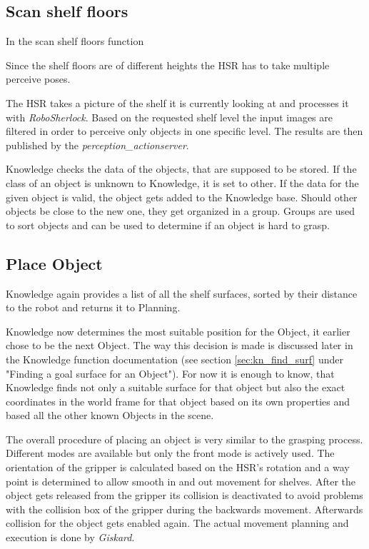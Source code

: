 \documentclass[main.tex]{subfiles}
\begin{document}
	\subsection{Scan shelf floors}
	
	In the scan shelf floors function
	
	Since the shelf floors are of different heights the HSR has to take multiple perceive poses.
	
	The HSR takes a picture of the shelf it is currently looking at and processes it with \textit{RoboSherlock}. Based on the requested shelf level the input images are filtered in order to perceive only objects in one specific level. The results are then published by the \textit{perception\_actionserver}.
	
	Knowledge checks the data of the objects, that are supposed to be stored. If the class of an object is unknown to Knowledge, it is set to other. If the data for the given object is valid, the object gets added to the Knowledge base. Should other objects be close to the new one, they get organized in a group. Groups are used to sort objects and can be used to determine if an object is hard to grasp.
	\subsection{Place Object}
	
	
	Knowledge again provides a list of all the shelf surfaces, sorted by their distance to the robot and returns it to Planning.
	
	
	Knowledge now determines the most suitable position for the Object, it earlier chose to be the next Object. The way this decision is made is discussed later in the Knowledge function documentation (see section \ref{sec:kn_find_surf} under "Finding a goal surface for an Object"). For now it is enough to know, that Knowledge finds not only a suitable surface for that object but also the exact coordinates in the world frame for that object based on its own properties and based all the other known Objects in the scene.
	
	The overall procedure of placing an object is very similar to the grasping process. Different modes are available but only the front mode is actively used. The orientation of the gripper is calculated based on the HSR's rotation and a way point is determined to allow smooth in and  out movement for shelves. After the object gets released from the gripper its collision is deactivated to avoid problems with the collision box of the gripper during the backwards movement. Afterwards collision for the object gets enabled again. The actual movement planning and execution is done by \textit{Giskard}.   	
	
\end{document}
